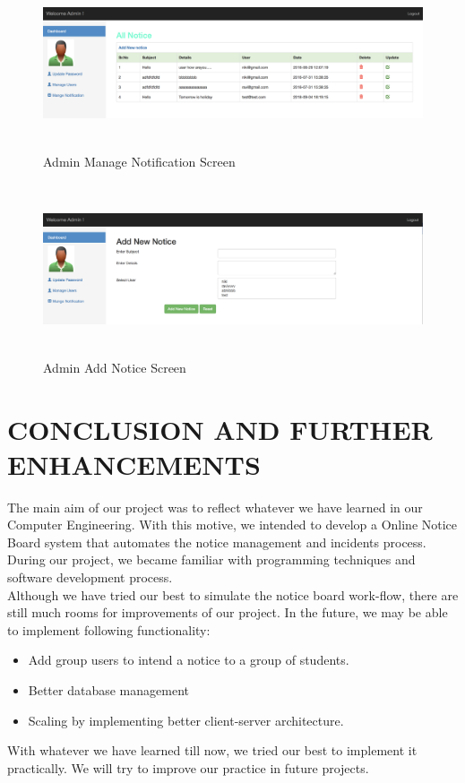 \documentclass[12pt,a4paper]{article}
\begin{document}
    \begin{figure}[H]
    	\centering
    	\includegraphics[width=\textwidth,height=2in]{figures/admin_view_all_notice.png}
    	\caption{Admin Manage Notification Screen}
    \end{figure}
    
    \begin{figure}[H]
    	\centering
    	\includegraphics[width=\textwidth,height=2in]{figures/admin_add_notice.png}
    	\caption{Admin Add Notice Screen}
    \end{figure}
    
\newpage
\section{CONCLUSION AND FURTHER ENHANCEMENTS}
The main aim of our project was to reflect whatever we have learned in our Computer Engineering. With this motive, we intended to develop a Online Notice Board system that automates the notice management and incidents process. During our project, we became  familiar with programming techniques and software development process.\\
Although we have tried our best to simulate the notice board work-flow, there are still much rooms for improvements of our project. In the future, we may be able to implement following functionality:
\begin{itemize}
    \item Add group users to intend a notice to a group of students.
    \item Better database management
    \item Scaling by implementing better client-server architecture.
\end{itemize}
With whatever we have learned till now, we tried our best to implement it practically. We will try to improve our practice in future projects.

\newpage


\end{document}
